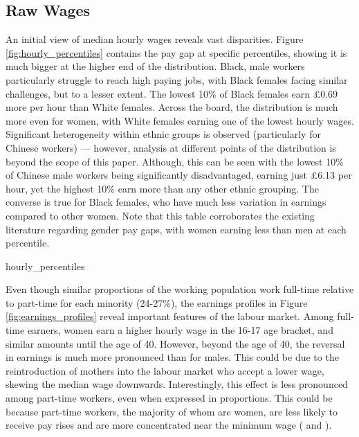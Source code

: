 \documentclass[class=article, crop=false]{standalone}
\begin{document}

\subsection{Raw Wages}
\label{sec:Wages}
An initial view of median hourly wages reveals vast disparities. Figure \ref{fig:hourly_percentiles} contains the pay gap at specific percentiles, showing it is much bigger at the higher end of the distribution. Black, male workers particularly struggle to reach high paying jobs, with Black females facing similar challenges, but to a lesser extent. The lowest 10\% of Black females earn £0.69 more per hour than White females. Across the board, the distribution is much more even for women, with White females earning one of the lowest hourly wages. Significant heterogeneity within ethnic groups is observed (particularly for Chinese workers) --- however, analysis at different points of the distribution is beyond the scope of this paper. Although, this can be seen with the lowest 10\% of Chinese male workers being significantly disadvantaged, earning just £6.13 per hour, yet the highest 10\% earn more than any other ethnic grouping. The converse is true for Black females, who have much less variation in earnings compared to other women. Note that this table corroborates the existing literature regarding gender pay gaps, with women earning less than men at each percentile.

{hourly_percentiles}
\doublespacing

Even though similar proportions of the working population work full-time relative to part-time for each minority (24-27\%), the earnings profiles in Figure \ref{fig:earnings_profiles} reveal important features of the labour market. Among full-time earners, women earn a higher hourly wage in the 16-17 age bracket, and similar amounts until the age of 40. However, beyond the age of 40, the reversal in earnings is much more pronounced than for males. This could be due to the reintroduction of mothers into the labour market who accept a lower wage, skewing the median wage downwards. Interestingly, this effect is less pronounced among part-time workers, even when expressed in proportions. This could be because part-time workers, the majority of whom are women, are less likely to receive pay rises and are more concentrated near the minimum wage (\citet{IFS} and \citet{ONSi}).
\end{document}
